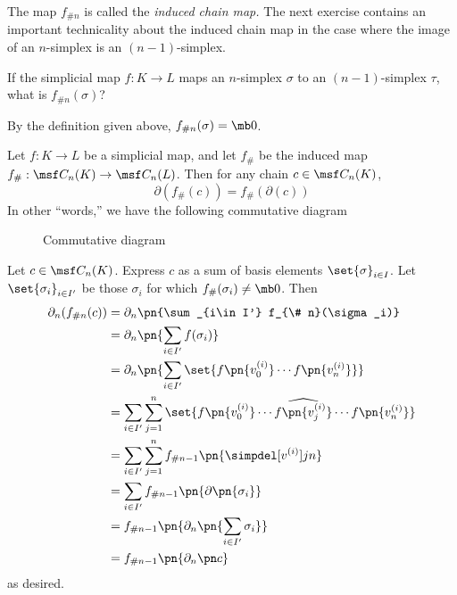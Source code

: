 The map $f_{\# n}$ is called the \emph{induced chain map.} The next exercise
contains an important technicality about the induced chain map in the case where
the image of an $n$-simplex is an $(n-1)$-simplex.
\begin{problem}[16.15]
  If the simplicial map $f : K \to L$ maps an $n$-simplex $\sigma$ to an
  $(n-1)$-simplex $\tau$, what is $f_{\# n}(\sigma)$?
\end{problem}
\begin{solution}
  By the definition given above, $f_{\# n}(\sigma) = \mb 0$.
\end{solution}
\begin{problem}[16.16]
  Let $f : K \to L$ be a simplicial map, and let $f_\#$ be the induced map $f_\#
  : \msf C_n(K) \to \msf C_n(L)$. Then for any chain $c \in \msf C_n(K)$,
  \[
    \partial (f_\# (c)) = f_{\#}(\partial(c))
  \]
  In other ``words,'' we have the following commutative diagram
  \begin{figure}[H]
    \centering
    \caption{Commutative diagram}
  \end{figure}
\end{problem}
\begin{solution}
  Let $c \in \msf C_n(K)$. Express $c$ as a sum of basis elements
  $\set{\sigma}_{i \in I}$. Let $\set{\sigma_i}_{i \in I'}$ be those $\sigma_i$
  for which $f_{\#}(\sigma_i) \neq \mb 0$. Then
  \begin{align*}
    \partial_{n} (f_{\# n}(c))
    &= \partial_n \pn{\sum_{i\in I'} f_{\# n}(\sigma_i)} \\
    &= \partial_n \pn{\sum_{i \in I'} f(\sigma_i)} \\
    &= \partial_n \pn{\sum_{i\in I'} \set{f\pn{v_0^{(i)}}\cdots f\pn{v_n^{(i)}}}} \\
    &= \sum_{i\in I'} \sum_{j=1}^n \set{f\pn{v_0^{(i)}}\cdots \widehat{f\pn{v_j^{(i)}}}\cdots f\pn{v_n^{(i)}}} \\
    &= \sum_{i \in I'} \sum_{j=1}^n f_{\# n-1} \pn{\simpdel[v^{(i)}]{j}{n}} \\
    &= \sum_{i \in I'} f_{\# n-1}\pn{\partial \pn{\sigma_i}} \\
    &= f_{\# n-1} \pn{ \partial_n \pn{ \sum_{i \in I'} \sigma_i }} \\
    &= f_{\# n-1} \pn{ \partial_n \pn c} \\
  \end{align*}
  as desired.
\end{solution}
